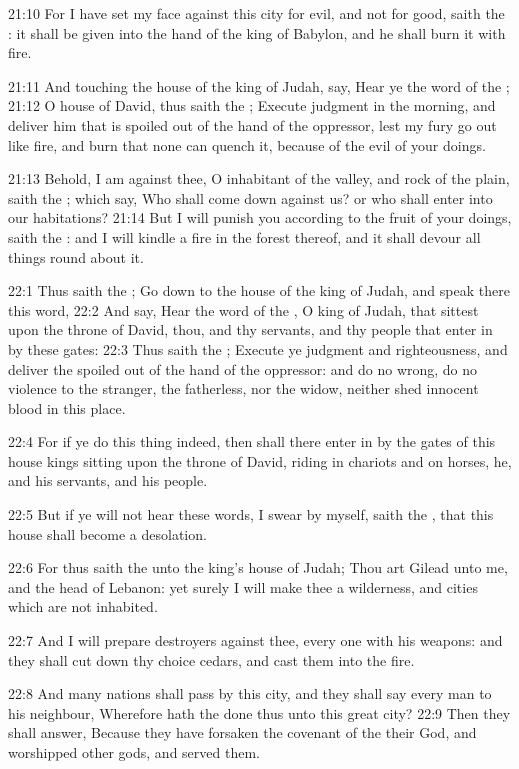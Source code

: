 21:10 For I have set my face against this city for evil, and not for
good, saith the \LORD: it shall be given into the hand of the king of
Babylon, and he shall burn it with fire.

21:11 And touching the house of the king of Judah, say, Hear ye the
word of the \LORD; 21:12 O house of David, thus saith the \LORD; Execute
judgment in the morning, and deliver him that is spoiled out of the
hand of the oppressor, lest my fury go out like fire, and burn that
none can quench it, because of the evil of your doings.

21:13 Behold, I am against thee, O inhabitant of the valley, and rock
of the plain, saith the \LORD; which say, Who shall come down against
us? or who shall enter into our habitations?  21:14 But I will punish
you according to the fruit of your doings, saith the \LORD: and I will
kindle a fire in the forest thereof, and it shall devour all things
round about it.

22:1 Thus saith the \LORD; Go down to the house of the king of Judah,
and speak there this word, 22:2 And say, Hear the word of the \LORD, O
king of Judah, that sittest upon the throne of David, thou, and thy
servants, and thy people that enter in by these gates: 22:3 Thus saith
the \LORD; Execute ye judgment and righteousness, and deliver the
spoiled out of the hand of the oppressor: and do no wrong, do no
violence to the stranger, the fatherless, nor the widow, neither shed
innocent blood in this place.

22:4 For if ye do this thing indeed, then shall there enter in by the
gates of this house kings sitting upon the throne of David, riding in
chariots and on horses, he, and his servants, and his people.

22:5 But if ye will not hear these words, I swear by myself, saith the
\LORD, that this house shall become a desolation.

22:6 For thus saith the \LORD unto the king's house of Judah; Thou art
Gilead unto me, and the head of Lebanon: yet surely I will make thee a
wilderness, and cities which are not inhabited.

22:7 And I will prepare destroyers against thee, every one with his
weapons: and they shall cut down thy choice cedars, and cast them into
the fire.

22:8 And many nations shall pass by this city, and they shall say
every man to his neighbour, Wherefore hath the \LORD done thus unto
this great city?  22:9 Then they shall answer, Because they have
forsaken the covenant of the \LORD their God, and worshipped other
gods, and served them.


